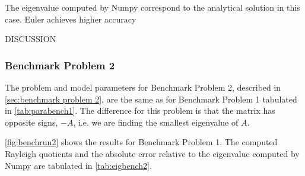 The eigenvalue computed by Numpy correspond to the analytical solution in this case. Euler achieves higher accuracy

DISCUSSION

\subsubsection{Benchmark Problem 2}

The problem and model parameters for Benchmark Problem 2, described in \autoref{sec:benchmark problem 2}, are the same as for Benchmark Problem 1 tabulated in \autoref{tab:parabench1}. The difference for this problem is that the matrix has opposite signs, $-A$, i.e. we are finding the smallest eigenvalue of $A$.

\autoref{fig:benchrun2} shows the results for Benchmark Problem 1. The computed Rayleigh quotients and the absolute error relative to the eigenvalue computed by Numpy are tabulated in \autoref{tab:eigbench2}. 

